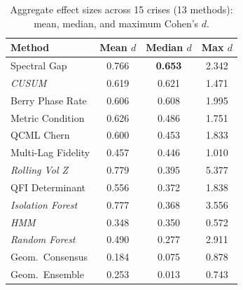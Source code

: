 \begin{table}[htbp]
\centering
\caption{Aggregate effect sizes across 15 crises (13 methods): mean, median, and maximum Cohen's $d$.}
\label{tab:aggregate_comparison}
\small
\begin{tabular}{lccc}
\toprule
Method & Mean $d$ & Median $d$ & Max $d$ \\
\midrule
Spectral Gap & 0.766 & \textbf{0.653} & 2.342 \\
\textit{CUSUM} & 0.619 & 0.621 & 1.471 \\
Berry Phase Rate & 0.606 & 0.608 & 1.995 \\
Metric Condition & 0.626 & 0.486 & 1.751 \\
QCML Chern & 0.600 & 0.453 & 1.833 \\
Multi-Lag Fidelity & 0.457 & 0.446 & 1.010 \\
\textit{Rolling Vol Z} & 0.779 & 0.395 & 5.377 \\
QFI Determinant & 0.556 & 0.372 & 1.838 \\
\textit{Isolation Forest} & 0.777 & 0.368 & 3.556 \\
\textit{HMM} & 0.348 & 0.350 & 0.572 \\
\textit{Random Forest} & 0.490 & 0.277 & 2.911 \\
Geom.\ Consensus & 0.184 & 0.075 & 0.878 \\
Geom.\ Ensemble & 0.253 & 0.013 & 0.743 \\
\bottomrule
\end{tabular}
\end{table}